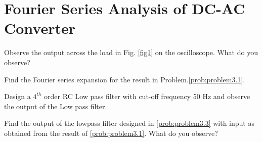\documentclass[journal,12pt,twocolumn]{IEEEtran}
\begin{document}
\section{Fourier Series Analysis of DC-AC Converter}
\begin{problem}
Observe the output across the load in Fig. \ref{fig1} on the oscilloscope. What do you observe? \label{prob:problem3.1}
\end{problem}
\begin{problem}
Find the Fourier series expansion for the result in Problem.\ref{prob:problem3.1}.
\end{problem}
\begin{problem}
Design a $4^{th}$ order RC Low pass filter with cut-off frequency 50 Hz and observe the output of the Low pass filter.\label{prob:problem3.3}
\end{problem} 
\begin{problem}
Find the output of the lowpass filter designed in \ref{prob:problem3.3} with input as obtained from the result of \ref{prob:problem3.1}. What do you observe? \label{prob:problem3.4}
\end{problem}
\end{document}
